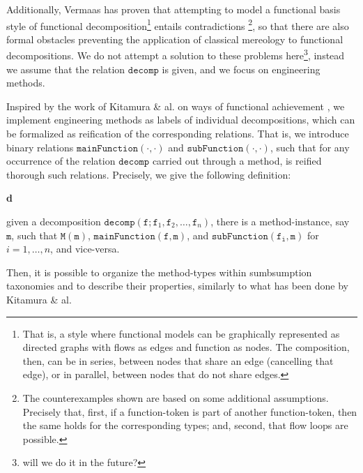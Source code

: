 \documentclass[sw]{iosart2x}
\newcommand{\bflist}{\begin{list}{}{\setlength{\topsep}{2mm}\setlength{\partopsep}{0mm}\setlength{\parsep}{0mm}\setlength{\leftmargin}{9mm}\setlength{\labelwidth}{8mm}}}
\newcommand{\eflist}{\end{list}}
\newcommand{\DefLabel}{\textrm{d}}
\newcounter{cntdef}
\newcommand{\mydf}[1]{\refstepcounter{cntdef}\begin{small}{\bf \DefLabel\thecntdef\label{def:#1}}\end{small}}
\newcommand{\generalStyle}[1]{\texttt{#1}}
\newcommand{\biRel}[3]{\generalStyle{#1}(#2,#3)}
\newcommand{\cst}[1]{\ensuremath{\mathtt{#1}}}
\newcommand{\mainFunction}[2]{\biRel{mainFunction}{#1}{#2}}
\newcommand{\subFunction}[2]{\biRel{subFunction}{#1}{#2}}
\newcommand{\decom}{\generalStyle{decomp}}
\newcommand{\TODO}[1]{{\color{red} #1}}
\newcommand{\myComment}[1]{}
\begin{document}
{\begin{itemize}
\end{itemize}
Additionally, Vermaas has proven that attempting to model a functional basis style of functional decomposition\footnote{That is, a style where functional models can be graphically represented as directed graphs with flows as edges and function as nodes. The composition, then, can be in series, between nodes that share an edge (cancelling that edge), or in parallel, between nodes that do not share edges.} entails contradictions \cite{vermaasFormalImpossibilityAnalysing2013}\footnote{The counterexamples shown are based on some additional assumptions. Precisely that, first, if a function-token is part of another function-token, then the same holds for the corresponding types; and, second, that flow loops are possible. %
}, so that there are also formal obstacles preventing the application of classical mereology to functional decompositions.
We do not attempt a solution to these problems here\footnote{\TODO{will we do it in the future?}}, instead we assume that the relation $\decom$ is given, and we focus on engineering methods. %

Inspired by the work of Kitamura \& al. on ways of functional achievement \cite{kitamuraOntologicalModelDevice2006, kitamuraOntologybasedDescriptionFunctional2003}, we implement engineering methods as labels of individual decompositions, which can be formalized as reification of the corresponding relations.
That is, we introduce binary relations $\mainFunction{\cdot}{\cdot}$ and $\subFunction{\cdot}{\cdot}$, such that for any occurrence of the relation $\decom$ carried out through a method, is reified thorough such relations.
Precisely, we give the following definition:
\bflist
  \item[\mydf{method}] given a decomposition $\decom(\cst{f};\cst{f}_1,\cst{f}_2,\dots,\cst{f}_n)$, there is \myComment{a corresponding method-type, say $\mathtt{M}$, and an instance of that type} a method-instance, say $\cst{m}$, such that 
  $ \mathtt{M}(\cst{m})$, $\mainFunction{\cst{f}}{\cst{m}}$, and $\subFunction{\cst{f_i}}{\cst{m}}$ for $i=1, \dots, n$, and vice-versa.
\eflist
Then, it is possible to organize the method-types within sumbsumption taxonomies and to describe their properties, similarly to what has been done by Kitamura \& al.  

}
\end{document}
